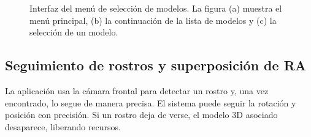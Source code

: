 \documentclass[conference]{IEEEtran}
\begin{document}
\begin{figure}[h!]
{            }
            \caption{Interfaz del menú de selección de modelos. La figura (a) muestra el menú principal, (b) la continuación de la lista de modelos y (c) la selección de un modelo.}
        \end{figure}

    
    \subsection{Seguimiento de rostros y superposición de RA}
        La aplicación usa la cámara frontal para detectar un rostro y, una vez encontrado, lo segue de manera precisa. El sistema puede seguir la rotación y posición con precisión. Si un rostro deja de verse, el modelo 3D asociado desaparece, liberando recursos.
        \begin{figure}[h!]
            \centering
            \quad
\end{figure}
\end{document}
